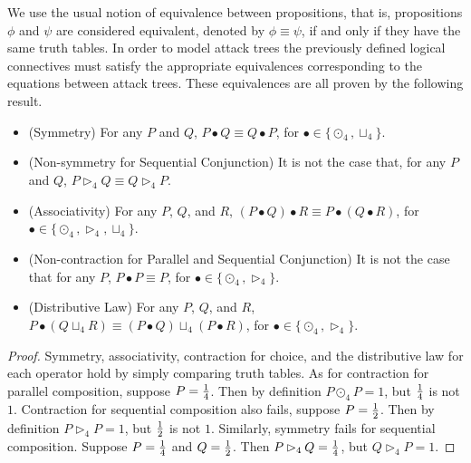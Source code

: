 We use the usual notion of equivalence between propositions, that is,
propositions $\phi$ and $\psi$ are considered equivalent, denoted by
$\phi \equiv \psi$, if and only if they have the same truth tables. In
order to model attack trees the previously defined logical connectives
must satisfy the appropriate equivalences corresponding to the
equations between attack trees.  These equivalences are all proven by
the following result.
\begin{lemma}
  \label{lemma:props_atree_ops_quaternary-semantics}
  \begin{itemize}
  \item[] (Symmetry) For any $P$ and $Q$, $P \bullet Q \equiv Q \bullet P$, for $\bullet \in \{\odot_4, \sqcup_4\}$.\\[-5px]
  \item[] (Non-symmetry for Sequential Conjunction) It is not the case that, for any $P$ and $Q$, $P \rhd_4 Q \equiv Q \rhd_4 P$.\\[-5px]
  \item[] (Associativity) For any $P$, $Q$, and $R$, $(P \bullet Q) \bullet R \equiv P \bullet (Q \bullet R)$, for $\bullet \in \{\odot_4, \rhd_4, \sqcup_4\}$.\\[-5px]
  \item[] (Non-contraction for Parallel and Sequential Conjunction) It is not the case that for any $P$, $P \bullet P \equiv P$, for $\bullet \in \{\odot_4, \rhd_4\}$.\\[-5px]
  \item[] (Distributive Law) For any $P$, $Q$, and $R$, $P \bullet (Q \sqcup_4 R) \equiv (P \bullet Q) \sqcup_4 (P \bullet R)$, for $\bullet \in \{\odot_4, \rhd_4\}$.\\[-5px]
  \end{itemize}
\end{lemma}
\begin{proof}
  Symmetry, associativity, contraction for choice, and the
  distributive law for each operator hold by simply comparing truth
  tables.  As for contraction for parallel composition, suppose $P =
  \frac{1}{4}$.  Then by definition $P \odot_4 P = 1$, but $\frac{1}{4}$ is not
  $1$.  Contraction for sequential composition also fails, suppose $P
  = \frac{1}{2}$.  Then by definition $P \rhd_4 P = 1$, but $\frac{1}{2}$ is not
  $1$.  Similarly, symmetry fails for sequential composition. Suppose
  $P = \frac{1}{4}$ and $Q = \frac{1}{2}$.  Then $P \rhd_4 Q = \frac{1}{4}$, but $Q
  \rhd_4 P = 1$.
\end{proof}

